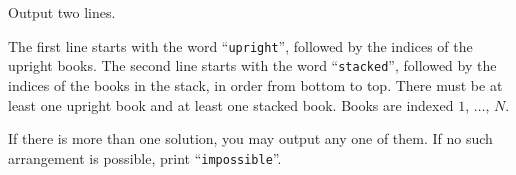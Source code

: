 
    Output two lines.

    The first line starts with the word ``\texttt{upright}'', followed by the indices of the upright books.
    The second line starts with the word ``\texttt{stacked}'', followed by the indices of the books in the stack, in order from bottom to top.
    There must be at least one upright book and at least one stacked book.
    Books are indexed $1$, $\ldots$, $N$.

    If there is more than one solution, you may output any one of them.
    If no such arrangement is possible, print ``\texttt{impossible}''.

